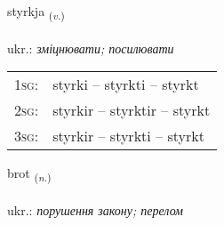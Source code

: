 \documentclass[frontgrid, backgrid]{flacards}\usepackage[]{graphicx}\usepackage[]{xcolor}
\begin{document}
\renewcommand{\blhead}{\vskip5pt {\small\bfseries\footnotesize Sagnorð | дієслово }}
\renewcommand{\bcfoot}{\vskip5pt \hspace{2pt}{\small\bfseries\footnotesize 1K}}


{styrkja \small{\textsubscript{(\textit{v.})}} \\[1ex] %
\textphonetic{[stɪr̥ca]} \\
ukr.: \emph{зміцнювати; посилювати} \\  [2ex]
\renewcommand*{\arraystretch}{0.8}
\begin{tabular}{p{1cm}l}
\textsc{1sg}: & styrki -- styrkti -- styrkt \\ 
\textsc{2sg}: & styrkir -- styrktir -- styrkt \\ 
\textsc{3sg}: & styrkir -- styrkti -- styrkt \\ 
\end{tabular}
}

\renewcommand{\flhead}{\vskip5pt \fboxsep=0pt {\small\bfseries\footnotesize Nafnorð | іменник}}
\renewcommand{\fcfoot}{\vskip5pt \fboxsep=0pt \hspace{2pt}{\small\bfseries\footnotesize 1K}}

\renewcommand{\blhead}{\vskip5pt {\small\bfseries\footnotesize Nafnorð | іменник }}
\renewcommand{\bcfoot}{\vskip5pt \hspace{2pt}{\small\bfseries\footnotesize 1K}}


{brot \small{\textsubscript{(\textit{n.})}} \\[1ex] %
\textphonetic{[prɔːt]} \\
ukr.: \emph{порушення закону; перелом} \\  [2ex]
\renewcommand*{\arraystretch}{0.8}
}
\end{document}
